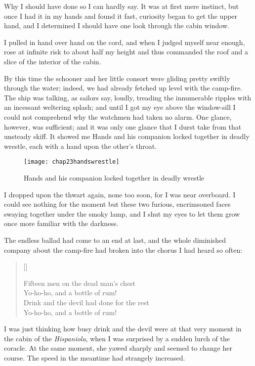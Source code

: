 Why I should have done so I can hardly say. It was at first mere instinct, but once I had it in my hands and found it fast, curiosity began to get the upper hand, and I determined I should have one look through the cabin window.

I pulled in hand over hand on the cord, and when I judged myself near enough, rose at infinite risk to about half my height and thus commanded the roof and a slice of the interior of the cabin.

By this time the schooner and her little consort were gliding pretty swiftly through the water; indeed, we had already fetched up level with the camp-fire. The ship was talking, as sailors say, loudly, treading the innumerable ripples with an incessant weltering splash; and until I got my eye above the window-sill I could not comprehend why the watchmen had taken no alarm. One glance, however, was sufficient; and it was only one glance that I durst take from that unsteady skiff. It showed me Hands and his companion locked together in deadly wrestle, each with a hand upon the other's throat.

   \begin{figure}[p]
\centering
\texttt{[image: chap23handswrestle]}
\caption[Locked together in deadly wrestle]{Hands and his companion locked together in deadly wrestle}
\end{figure}  

I dropped upon the thwart again, none too soon, for I was near overboard. I could see nothing for the moment but these two furious, encrimsoned faces swaying together under the smoky lamp, and I shut my eyes to let them grow once more familiar with the darkness.

The endless ballad had come to an end at last, and the whole diminished company about the camp-fire had broken into the chorus I had heard so often:

\settowidth{\versewidth}{Drink and the devil had done for the rest\longdash}
\begin{verse}[\versewidth]
\begin{altverse}
Fifteen men on the dead man’s chest\longdash\\
Yo-ho-ho, and a bottle of rum!\\
Drink and the devil had done for the rest\longdash\\
Yo-ho-ho, and a bottle of rum!
\end{altverse}
\end{verse}

I was just thinking how busy drink and the devil were at that very moment in the cabin of the \textit{Hispaniola}, when I was surprised by a sudden lurch of the coracle. At the same moment, she yawed sharply and seemed to change her course. The speed in the meantime had strangely increased.

